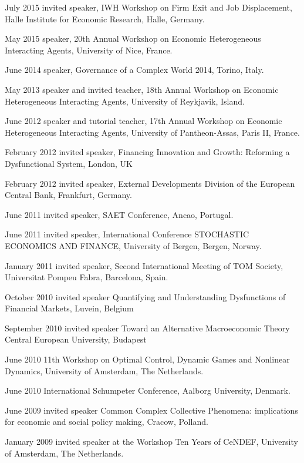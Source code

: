 \documentclass[a4paper]{article}
\begin{document}
July 2015 invited speaker, IWH Workshop on Firm Exit and Job
Displacement, Halle Institute for Economic Research, Halle, Germany.

May 2015 speaker, 20th Annual Workshop on Economic Heterogeneous
Interacting Agents, University of Nice, France.

June 2014 speaker, Governance of a Complex World 2014, Torino, Italy.

May 2013 speaker and invited teacher, 18th Annual Workshop on
Economic Heterogeneous Interacting Agents, University of Reykjavik,
Island.

June 2012 speaker and tutorial teacher, 17th Annual Workshop on
Economic Heterogeneous Interacting Agents, University of
Pantheon-Assas, Paris II, France.

February 2012 invited speaker, Financing Innovation and Growth:
Reforming a Dysfunctional System, London, UK

February 2012 invited speaker, External Developments Division of the
European Central Bank, Frankfurt, Germany.

June 2011 invited speaker, SAET Conference, Ancao, Portugal.

June 2011 invited speaker, International Conference STOCHASTIC
ECONOMICS AND FINANCE, University of Bergen, Bergen, Norway.

January 2011 invited speaker, Second International Meeting of TOM
Society, Universitat Pompeu Fabra, Barcelona, Spain.

October 2010 invited speaker \textquotedbl{}Quantifying and Understanding
Dysfunctions of Financial Markets\textquotedbl{}, Luvein, Belgium

September 2010 invited speaker \textquotedbl{}Toward an Alternative Macroeconomic
Theory\textquotedbl{} Central European University, Budapest

June 2010 \textquotedbl{}11th Workshop on Optimal Control, Dynamic Games and
Nonlinear Dynamics\textquotedbl{}, University of Amsterdam, The Netherlands.

June 2010 \textquotedbl{}International Schumpeter Conference\textquotedbl{}, Aalborg University,
Denmark.

June 2009 invited speaker \textquotedbl{}Common Complex Collective Phenomena:
implications for economic and social policy making\textquotedbl{}, Cracow, Polland.

January 2009 invited speaker at the Workshop \textquotedbl{}Ten Years of CeNDEF\textquotedbl{},
University of Amsterdam, The Netherlands.
\end{document}
